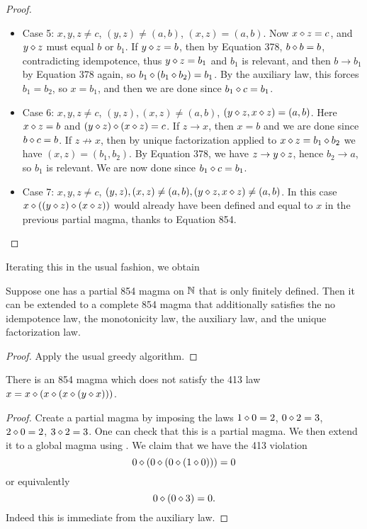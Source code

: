\begin{proof}
\begin{itemize}
  \item Case 5: $x,y,z \neq c$, $(y,z) \neq (a,b)$, $(x,z) = (a,b)$.  Now $x \diamond z = c$, and $y \diamond z$ must equal $b$ or $b_1$.  If $y \diamond z = b$, then by Equation 378, $b \diamond b = b$, contradicting idempotence, thus $y \diamond z = b_1$ and $b_1$ is relevant, and then $b \to b_1$ by Equation 378 again, so $b_1 \diamond (b_1 \diamond b_2) = b_1$.  By the auxiliary law, this forces $b_1 = b_2$, so $x = b_1$, and then we are done since $b_1 \diamond c = b_1$.
  \item Case 6: $x,y,z \neq c$, $(y,z), (x,z) \neq (a,b)$, $(y \diamond z, x \diamond z) = (a,b)$.  Here $x \diamond z = b$ and $(y \diamond z) \diamond (x \diamond z) = c$.  If $z \to x$, then $x=b$ and we are done since $b \diamond c = b$.  If $z \not \to x$, then by unique factorization applied to $x \diamond z = b_1 \diamond b_2$ we have $(x,z) = (b_1,b_2)$.  By Equation 378, we have $z \to y \diamond z$, hence $b_2 \to a$, so $b_1$ is relevant.  We are now done since $b_1 \diamond c = b_1$.
  \item Case 7: $x,y,z \neq c$, $(y,z), (x,z) \neq (a,b), (y \diamond z, x \diamond z) \neq (a,b)$.  In this case $x \diamond ((y \diamond z) \diamond (x \diamond z))$ would already have been defined and equal to $x$ in the previous partial magma, thanks to Equation 854.
\end{itemize}
\end{proof}

Iterating this in the usual fashion, we obtain

\begin{corollary}[854 extension]\label{extend-854}\leanok{}
Suppose one has a partial 854 magma on $\mathbb{N}$ that is only finitely defined.  Then it can be extended to a complete 854 magma that additionally satisfies the no idempotence law, the monotonicity law, the auxiliary law, and the unique factorization law.
\end{corollary}

\begin{proof}  Apply the usual greedy algorithm.
\end{proof}

\begin{corollary}\leanok{}\label{854-413}  There is an 854 magma which does not satisfy the 413 law $x = x \diamond (x \diamond (x \diamond (y \diamond x)))$.
\end{corollary}

\begin{proof} Create a partial magma by imposing the laws $1 \diamond 0 = 2$, $0 \diamond 2 = 3$, $2 \diamond 0 = 2$, $3 \diamond 2 = 3$.  One can check that this is a partial magma.  We then extend it to a global magma using .  We claim that we have the 413 violation
  $$ 0 \diamond (0 \diamond (0 \diamond (1 \diamond 0))) = 0$$
  or equivalently
  $$ 0 \diamond (0 \diamond 3) = 0.$$
Indeed this is immediate from the auxiliary law.
\end{proof}

